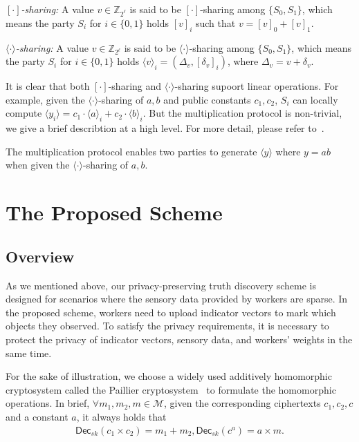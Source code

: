 \documentclass[conference]{IEEEtran}
\begin{document}
\textit{$[\cdot]$-sharing:} A value $v\in\mathbb{Z}_{2^\ell}$ is said to be $[\cdot]$-sharing among $\{S_0, S_1\}$, which means the party $S_i$ for $i\in\{0,1\}$ holds $[v]_i$ such that $v = [v]_0 + [v]_1$.

\textit{$\langle \cdot \rangle$-sharing:} A value $v\in\mathbb{Z}_{2^\ell}$ is said to be $\langle \cdot \rangle$-sharing among $\{S_0, S_1\}$, which means the party $S_i$ for $i\in\{0,1\}$ holds $\langle v \rangle_i = (\Delta_v, [\delta_v]_i)$, where $\Delta_v = v + \delta_v$.

It is clear that both $[\cdot]$-sharing and $\langle \cdot \rangle$-sharing supoort linear operations.
For example, given the $\langle \cdot \rangle$-sharing of $a,b$ and public constants $c_1,c_2$, $S_i$ can locally compute $\langle y_i \rangle = c_1 \cdot \langle a \rangle_i + c_2 \cdot \langle b \rangle_i$.
But the multiplication protocol is non-trivial, we give a brief describtion at a high level.
For more detail, please refer to~\cite{patra_aby20_2020}.

The multiplication protocol enables two parties to generate $\langle y \rangle$ where $y = ab$ when given the $\langle \cdot \rangle$-sharing of $a,b$.
\fi

\section{The Proposed Scheme}\label{sec5}
\subsection{Overview}
As we mentioned above, our privacy-preserving truth discovery scheme is designed for scenarios where the sensory data provided by workers are sparse.
In the proposed scheme, workers need to upload indicator vectors to mark which objects they observed.
To satisfy the privacy requirements, it is necessary to protect the privacy of indicator vectors, sensory data, and workers' weights in the same time.

For the sake of illustration, we choose a widely used additively homomorphic cryptosystem called the Paillier cryptosystem~\cite{paillier_public-key_1999} to formulate the homomorphic operations.
In brief, $\forall m_1, m_2, m\in\mathcal{M}$, given the corresponding ciphertexts $c_1,c_2,c$ and a constant $a$, it always holds that 
\begin{equation*}
  \begin{split}
  \mathsf{Dec}_{sk}(c_1 \times c_2) = m_1 + m_2, \mathsf{Dec}_{sk}(c ^ a ) = a\times m.
  \end{split}
\end{equation*}
\end{document}
